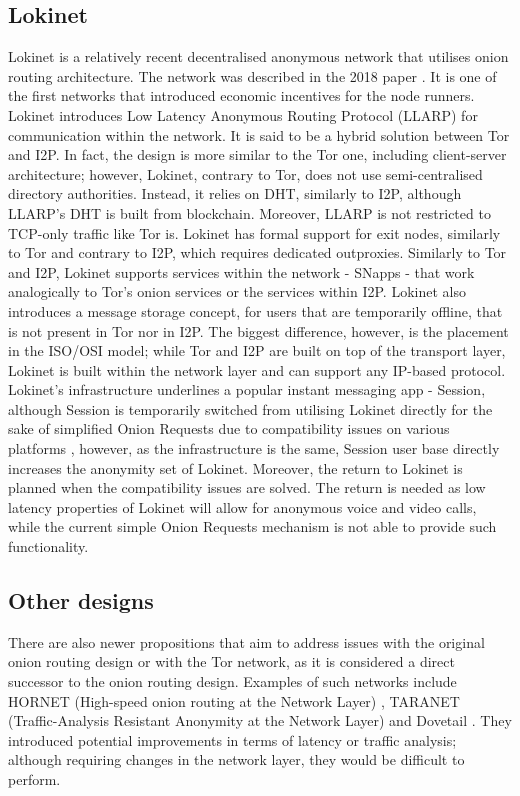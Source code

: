 \subsection{Lokinet}
Lokinet is a relatively recent decentralised anonymous network that utilises onion routing architecture. The network was described in the 2018 paper \cite{loki}. It is one of the first networks that introduced economic incentives for the node runners. Lokinet introduces Low Latency Anonymous Routing Protocol (LLARP) for communication within the network. It is said to be a hybrid solution between Tor and I2P. In fact, the design is more similar to the Tor one, including client-server architecture; however, Lokinet, contrary to Tor, does not use semi-centralised directory authorities. Instead, it relies on DHT, similarly to I2P, although LLARP's DHT is built from blockchain. Moreover, LLARP is not restricted to TCP-only traffic like Tor is. Lokinet has formal support for exit nodes, similarly to Tor and contrary to I2P, which requires dedicated outproxies. Similarly to Tor and I2P, Lokinet supports services within the network - SNapps - that work analogically to Tor’s onion services or the services within I2P. Lokinet also introduces a message storage concept, for users that are temporarily offline, that is not present in Tor nor in I2P.
The biggest difference, however, is the placement in the ISO/OSI model; while Tor and I2P are built on top of the transport layer, Lokinet is built within the network layer and can support any IP-based protocol.
Lokinet’s infrastructure underlines a popular instant messaging app - Session, although Session is temporarily switched from utilising Lokinet directly for the sake of simplified Onion Requests due to compatibility issues on various platforms \cite{onion-requests}, however, as the infrastructure is the same, Session user base directly increases the anonymity set of Lokinet. Moreover, the return to Lokinet is planned when the compatibility issues are solved. The return is needed as low latency properties of Lokinet will allow for anonymous voice and video calls, while the current simple Onion Requests mechanism is not able to provide such functionality.

\subsection{Other designs}
There are also newer propositions that aim to address issues with the original onion routing design or with the Tor network, as it is considered a direct successor to the onion routing design. Examples of such networks include HORNET (High-speed onion routing at the Network Layer) \cite{hornet}, TARANET (Traffic-Analysis Resistant Anonymity at the Network Layer) \cite{taranet} and Dovetail \cite{dovetail}. They introduced potential improvements in terms of latency or traffic analysis; although requiring changes in the network layer, they would be difficult to perform.


